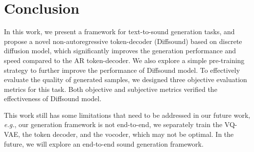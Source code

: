 \documentclass[lettersize,journal]{IEEEtran}
\begin{document}
\section{Conclusion} 
In this work, we present a framework for text-to-sound generation tasks, and propose a novel non-autoregressive token-decoder (Diffsound) based on discrete diffusion model, which significantly improves the generation performance and speed compared to the AR token-decoder. We also explore a simple pre-training strategy to further improve the performance of Diffsound model. To effectively evaluate the quality of generated samples, we designed three objective evaluation metrics for this task. Both objective and subjective metrics verified the effectiveness of Diffsound model.

This work still has some limitations that need to be
addressed in our future work, \textit{e.g.}, our generation framework is not end-to-end, we separately train the VQ-VAE, the token decoder, and the vocoder, which may not be optimal. In the future, we will explore an end-to-end sound generation framework.







\appendices
\end{document}
